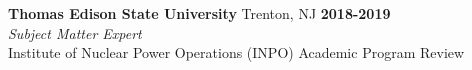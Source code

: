 \documentclass[margin,line]{resume}
\begin{document}
\begin{resume}
    \textbf{Thomas Edison State University} Trenton, NJ \hfill
    \textbf{2018-2019}\\
    \textsl{Subject Matter Expert} \\
    Institute of Nuclear Power Operations (INPO) Academic Program Review\\






\end{resume}
\end{document}
